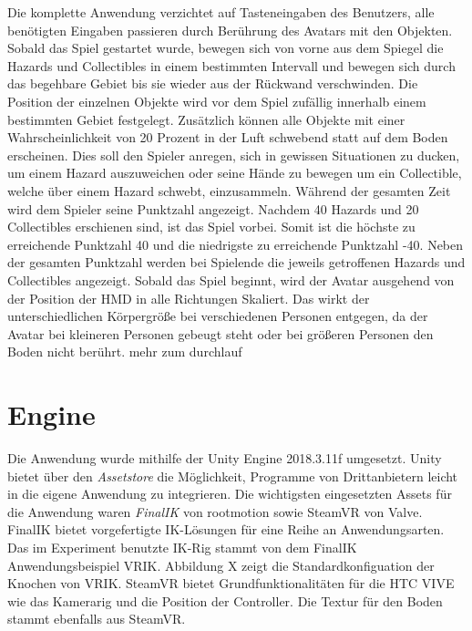 Die komplette Anwendung verzichtet auf Tasteneingaben des Benutzers, alle benötigten Eingaben passieren durch Berührung des Avatars mit den Objekten.
Sobald das Spiel gestartet wurde, bewegen sich von vorne aus dem Spiegel die Hazards und Collectibles in einem bestimmten Intervall und bewegen sich durch das begehbare Gebiet bis sie wieder aus der Rückwand verschwinden. Die Position der einzelnen Objekte wird vor dem Spiel zufällig innerhalb einem bestimmten Gebiet festgelegt. Zusätzlich können alle Objekte mit einer Wahrscheinlichkeit von 20 Prozent in der Luft schwebend statt auf dem Boden erscheinen. Dies soll den Spieler anregen, sich in gewissen Situationen zu ducken, um einem Hazard auszuweichen oder seine Hände zu bewegen um ein Collectible, welche über einem Hazard schwebt, einzusammeln. Während der gesamten Zeit wird dem Spieler seine Punktzahl angezeigt. Nachdem 40 Hazards und 20 Collectibles erschienen sind, ist das Spiel vorbei. Somit ist die höchste zu erreichende Punktzahl 40 und die niedrigste zu erreichende Punktzahl -40. Neben der gesamten Punktzahl werden bei Spielende die jeweils getroffenen Hazards und Collectibles angezeigt.
Sobald das Spiel beginnt, wird der Avatar ausgehend von der Position der HMD in alle Richtungen Skaliert. Das wirkt der unterschiedlichen Körpergröße bei verschiedenen Personen entgegen, da der Avatar bei kleineren Personen gebeugt steht oder bei größeren Personen den Boden nicht berührt.
mehr zum durchlauf



\section{Engine}
Die Anwendung wurde mithilfe der Unity Engine 2018.3.11f umgesetzt.
Unity bietet über den \textit{Assetstore} die Möglichkeit, Programme von Drittanbietern leicht in die eigene Anwendung zu integrieren. Die wichtigsten eingesetzten Assets für die Anwendung waren \textit{FinalIK} von rootmotion\cite{rootmotion} sowie SteamVR von Valve. FinalIK bietet vorgefertigte IK-Lösungen für eine Reihe an Anwendungsarten. Das im Experiment benutzte IK-Rig stammt von dem FinalIK Anwendungsbeispiel VRIK. Abbildung X zeigt die Standardkonfiguation der Knochen von VRIK. SteamVR bietet Grundfunktionalitäten für die HTC VIVE wie das Kamerarig und die Position der Controller. Die Textur für den Boden stammt ebenfalls aus SteamVR.


